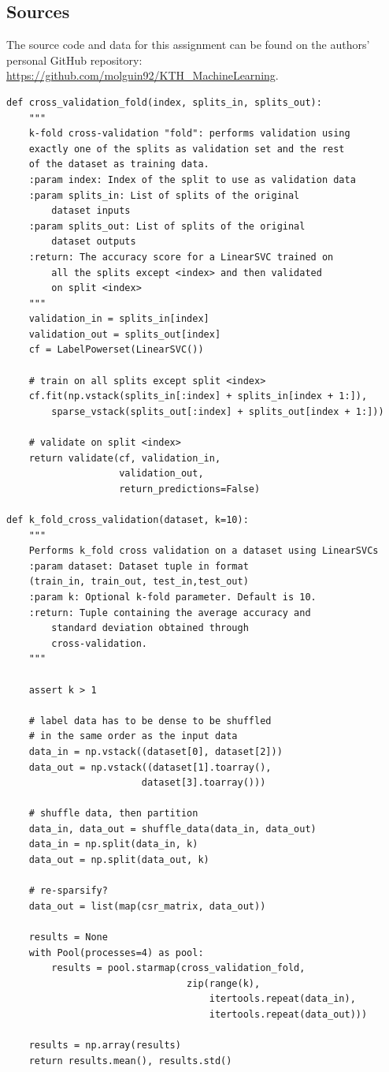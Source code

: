 \documentclass{kthreport}
\theoremstyle{definition}
\begin{document}
\subsection{Sources}

The source code and data for this assignment can be found on the authors' personal GitHub repository: \url{https://github.com/molguin92/KTH_MachineLearning}.

\newpage
\printbibliography%
\newpage
\begin{lstlisting}[style=MyPython, caption={Extract of the k-fold cross-validation subroutines.}, label={lst:kfoldcv}]
def cross_validation_fold(index, splits_in, splits_out):
	"""
	k-fold cross-validation "fold": performs validation using 
    exactly one of the splits as validation set and the rest 
    of the dataset as training data.
	:param index: Index of the split to use as validation data
	:param splits_in: List of splits of the original 
        dataset inputs
	:param splits_out: List of splits of the original 
        dataset outputs
	:return: The accuracy score for a LinearSVC trained on 
        all the splits except <index> and then validated 
        on split <index>
	"""
	validation_in = splits_in[index]
	validation_out = splits_out[index]
	cf = LabelPowerset(LinearSVC())
	
	# train on all splits except split <index>
	cf.fit(np.vstack(splits_in[:index] + splits_in[index + 1:]),
		sparse_vstack(splits_out[:index] + splits_out[index + 1:]))
	
	# validate on split <index>
	return validate(cf, validation_in, 
                    validation_out, 
                    return_predictions=False)

def k_fold_cross_validation(dataset, k=10):
	"""
	Performs k_fold cross validation on a dataset using LinearSVCs
	:param dataset: Dataset tuple in format 
    (train_in, train_out, test_in,test_out)
	:param k: Optional k-fold parameter. Default is 10.
	:return: Tuple containing the average accuracy and 
        standard deviation obtained through 
        cross-validation.
	"""
	
	assert k > 1
	
	# label data has to be dense to be shuffled
	# in the same order as the input data
	data_in = np.vstack((dataset[0], dataset[2]))
	data_out = np.vstack((dataset[1].toarray(),
                        dataset[3].toarray()))
	
	# shuffle data, then partition
	data_in, data_out = shuffle_data(data_in, data_out)
	data_in = np.split(data_in, k)
	data_out = np.split(data_out, k)
	
	# re-sparsify?
	data_out = list(map(csr_matrix, data_out))
	
	results = None
	with Pool(processes=4) as pool:
		results = pool.starmap(cross_validation_fold,
                                zip(range(k),
                                    itertools.repeat(data_in),
                                    itertools.repeat(data_out)))
	
	results = np.array(results)
	return results.mean(), results.std()
\end{lstlisting}
\end{document}
